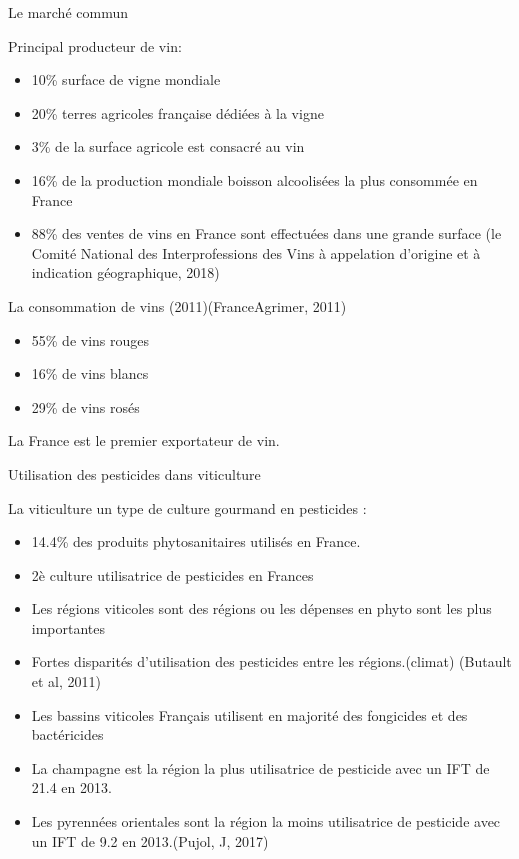 \documentclass[11pt,ignorenonframetext,]{beamer}
\providecommand{\tightlist}{%
  \setlength{\itemsep}{0pt}\setlength{\parskip}{0pt}}
\begin{document}
\begin{frame}{Le marché commun}
\protect\hypertarget{le-marche-commun}{}

Principal producteur de vin:

\begin{itemize}
\tightlist
\item
  10\% surface de vigne mondiale
\item
  20\% terres agricoles française dédiées à la vigne
\item
  3\% de la surface agricole est consacré au vin
\item
  16\% de la production mondiale boisson alcoolisées la plus consommée
  en France
\item
  88\% des ventes de vins en France sont effectuées dans une grande
  surface (le Comité National des Interprofessions des Vins à appelation
  d'origine et à indication géographique, 2018)
\end{itemize}

La consommation de vins (2011)(FranceAgrimer, 2011)

\begin{itemize}
\tightlist
\item
  55\% de vins rouges
\item
  16\% de vins blancs
\item
  29\% de vins rosés
\end{itemize}

La France est le premier exportateur de vin.

\end{frame}

\begin{frame}{Utilisation des pesticides dans viticulture}
\protect\hypertarget{utilisation-des-pesticides-dans-viticulture}{}

La viticulture un type de culture gourmand en pesticides :

\begin{itemize}
\tightlist
\item
  14.4\% des produits phytosanitaires utilisés en France.
\item
  2è culture utilisatrice de pesticides en Frances
\item
  Les régions viticoles sont des régions ou les dépenses en phyto sont
  les plus importantes
\item
  Fortes disparités d'utilisation des pesticides entre les
  régions.(climat) (Butault et al, 2011)
\item
  Les bassins viticoles Français utilisent en majorité des fongicides et
  des bactéricides
\item
  La champagne est la région la plus utilisatrice de pesticide avec un
  IFT de 21.4 en 2013.
\item
  Les pyrennées orientales sont la région la moins utilisatrice de
  pesticide avec un IFT de 9.2 en 2013.(Pujol, J, 2017)
\end{itemize}

\end{frame}
\end{document}
